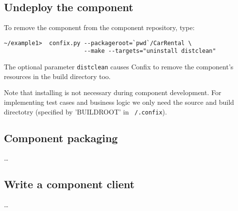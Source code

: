 \subsection{Undeploy the component}

To remove the component from the component repository, type:

\begin{small}
\begin{verbatim}
~/example1>  confix.py --packageroot=`pwd`/CarRental \
                       --make --targets="uninstall distclean" 
\end{verbatim}
\end{small}

The optional parameter {\tt distclean} causes Confix to remove the
component's resources in the build directory too.

Note that installing is not necessary during component development. 
For implementing test cases and business logic we only need the source and
build directotry (specified by 'BUILDROOT' in {\tt ~/.confix}).
 


\newpage
\subsection{Component packaging}
\dots

\subsection{Write a component client}
\dots





 

